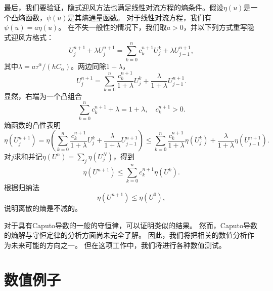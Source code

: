 最后，我们要验证，隐式迎风方法也满足线性对流方程的熵条件。假设$ \eta(u)$是一个凸熵函数，$ \psi(u)$是其熵通量函数。 对于线性对流方程，我们有$ \psi(u)= a \eta(u)$。 在不失一般性的情况下，我们取$ a> 0 $，并以下列方式重写隐式迎风方格式：
\[
U_j^{n+1}  +\lambda U^{n+1}_j=\sum_{k=0}^{n} c^{n+1}_k U_j^k  +\lambda U^{n+1}_{j-1},
\]
其中$\lambda= a \tau^ \alpha/ (h C_\alpha)$。两边同除$1+\lambda$，
\[
U_j^{n+1}=\sum_{k=0}^{n} \frac{c^{n+1}_k}{1+\lambda} U_j^k  +\frac{\lambda}{1+\lambda} U^{n+1}_{j-1}.
\]
显然，右端为一个凸组合
\[
\sum_{k=0}^{n} c^{n+1}_k + \lambda = 1+ \lambda, \quad c_k^{n+1}>0.
\]
熵函数的凸性表明
\[
\eta \left( U_j^{n+1} \right)=\eta \left( \sum_{k=0}^{n} \frac{c^{n+1}_k}{1+\lambda} U_j^k  +\frac{\lambda}{1+\lambda} U^{n+1}_{j-1} \right) \le \sum_{k=0}^{n} \frac{c^{n+1}_k}{1+\lambda}  \eta \left( U_j^k \right) +\frac{\lambda}{1+\lambda}\eta \left( U^{n+1}_{j-1} \right).
\]
对$j$求和并记$\eta(U^n)= \sum_j \eta(U^N_j)$，得到
\[
\eta \left( U^{n+1} \right) \le \sum_{k=0}^{n} {c^{n+1}_k} \eta \left( U^k \right). 
\]
根据归纳法
\[
\eta \left( U^{n+1} \right) \le  \eta \left( U^0 \right),
\]
说明离散的熵是不减的。

对于具有Caputo导数的一般的守恒律，可以证明类似的结果。 然而，Caputo导数的熵解与守恒定律的分析方面尚未完全了解。 因此，我们将把相关的数值分析作为未来可能的方向之一。 但在这项工作中，我们将进行各种数值测试。



\section{数值例子}
